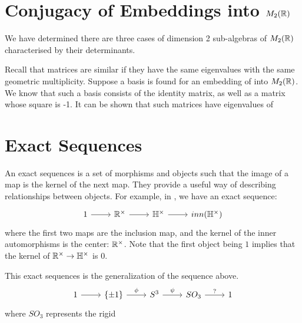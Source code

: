 \documentclass{article}
\begin{document}
\section{Conjugacy of Embeddings into $M_2(\protect\mathbb{R})$}
We have determined there are three cases of dimension 2 sub-algebras of $M_2(\protect\mathbb{R})$ characterised by their determinants. 

Recall that matrices are similar if they have the same eigenvalues with the same geometric multiplicity. Suppose a basis is found for an embedding of \bC into $M_2(\protect\mathbb{R})$. We know that such a basis consists of the identity matrix, as well as a matrix whose square is -1. It can be shown that such matrices have eigenvalues of


\section{Exact Sequences}
An exact sequences is a set of morphisms and objects such that the image of a map is the kernel of the next map. They provide a useful way of describing relationships between objects. 
For example, in \bH, we have an exact sequence:
\begin{equation}
    \begin{tikzcd}
        1 \arrow{r} & \bR^{\times} \arrow{r} & \bH^{\times} \arrow{r} & inn(\bH^{\times})
    \end{tikzcd}
\end{equation}
where the first two maps are the inclusion map, and the kernel of the inner automorphisms is the center: $\protect\mathbb{R}^{\times}$. Note that the first object being $1$ implies that the kernel of $\protect\mathbb{R}^{\times} \rightarrow \protect\mathbb{H}^{\times}$ is $0$.

This exact sequences is the generalization of the sequence above.
\begin{equation}
\begin{tikzcd}
1 \arrow{r} & \{\pm 1\} \arrow[r, "\phi"] & S^3 \arrow[r, "\psi"] & SO_3 \arrow[r, "?"] & 1
\end{tikzcd}
\end{equation}
where $SO_3$ represents the rigid 
\end{document}
